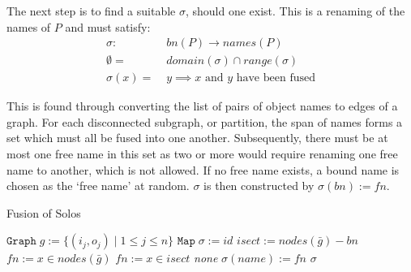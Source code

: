         The next step is to find a suitable $\sigma$, should one exist. This is a renaming of the names of $P$ and must satisfy:
        \begin{align*}
            \sigma : \; & bn(P) \rightarrow names(P) \\
            \emptyset = \; & domain(\sigma) \cap range(\sigma) \\
            \sigma(x) = \; & y \implies \text{$x$ and $y$ have been fused}
        \end{align*}

        This is found through converting the list of pairs of object names to edges of a graph.
        For each disconnected subgraph, or partition, the span of names forms a set which must all be fused into one another.
        Subsequently, there must be at most one free name in this set as two or more would require renaming one free name to another, which is not allowed.
        If no free name exists, a bound name is chosen as the `free name' at random.
        $\sigma$ is then constructed by $\sigma(bn) := fn$.

        \begin{breakablealgorithm}
            \caption{Fusion of Solos}
            \begin{algorithmic}[1]
                    \State$\texttt{Graph} \; g := \{(i_j, o_j) \; | \; 1 \leq j \leq n\}$
                    \State$\texttt{Map} \; \sigma := id$
                        \State$isect := nodes(\bar{g}) - bn$
                            \State$fn := x \in nodes(\bar{g})$
                            \State$fn := x \in isect$
                        \Else
                            \State\Return\textit{none}
                        \EndIf
                            \State$\sigma(name) := fn$
                        \EndFor
                    \EndFor
                    \State\Return$\sigma$
                \EndFunction
            \end{algorithmic}
        \end{breakablealgorithm}

